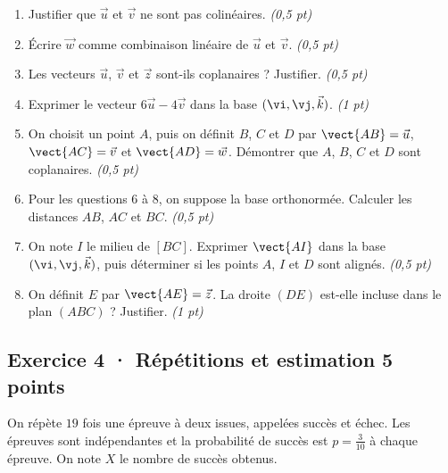 \begin{enumerate}

\item Justifier que $\vec u$ et $\vec v$ ne sont pas colinéaires. \hfill\textit{(0,5 pt)}

\item Écrire $\vec w$ comme combinaison linéaire de $\vec u$ et $\vec v$. \hfill\textit{(0,5 pt)}

\item Les vecteurs $\vec u$, $\vec v$ et $\vec z$ sont-ils coplanaires ? Justifier. \hfill\textit{(0,5 pt)}

\item Exprimer le vecteur $6\vec u-4\vec v$ dans la base $(\vi,\vj,\vec k)$. \hfill\textit{(1 pt)}

\item On choisit un point $A$, puis on définit $B$, $C$ et $D$ par $\vect{AB}=\vec u$, $\vect{AC}=\vec v$ et $\vect{AD}=\vec w$. Démontrer que $A$, $B$, $C$ et $D$ sont coplanaires. \hfill\textit{(0,5 pt)}

\item Pour les questions 6 à 8, on suppose la base orthonormée. Calculer les distances $AB$, $AC$ et $BC$. \hfill\textit{(0,5 pt)}

\item On note $I$ le milieu de $[BC]$. Exprimer $\vect{AI}$ dans la base $(\vi,\vj,\vec k)$, puis déterminer si les points $A$, $I$ et $D$ sont alignés. \hfill\textit{(0,5 pt)}

\item On définit $E$ par $\vect{AE}=\vec z$. La droite $(DE)$ est-elle incluse dans le plan $(ABC)$ ? Justifier. \hfill\textit{(1 pt)}

\end{enumerate}

\subsection*{Exercice 4 · Répétitions et estimation \hfill 5 points}On répète $19$ fois une épreuve à deux issues, appelées succès et échec. Les épreuves sont indépendantes et la probabilité de succès est $p=\frac{3}{10}$ à chaque épreuve. On note $X$ le nombre de succès obtenus.


